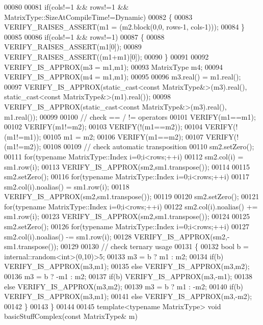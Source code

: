 \begin{DoxyCode}
00080 
00081   \textcolor{keywordflow}{if}(cols!=1 && rows!=1 && MatrixType::SizeAtCompileTime!=Dynamic)
00082   \{
00083     VERIFY\_RAISES\_ASSERT(m1 = (m2.block(0,0, rows-1, cols-1)));
00084   \}
00085 
00086   \textcolor{keywordflow}{if}(cols!=1 && rows!=1)
00087   \{
00088     VERIFY\_RAISES\_ASSERT(m1[0]);
00089     VERIFY\_RAISES\_ASSERT((m1+m1)[0]);
00090   \}
00091 
00092   VERIFY\_IS\_APPROX(m3 = m1,m1);
00093   MatrixType m4;
00094   VERIFY\_IS\_APPROX(m4 = m1,m1);
00095 
00096   m3.real() = m1.real();
00097   VERIFY\_IS\_APPROX(static\_cast<const MatrixType&>(m3).real(), static\_cast<const MatrixType&>(m1).real());
00098   VERIFY\_IS\_APPROX(static\_cast<const MatrixType&>(m3).real(), m1.real());
00099 
00100   \textcolor{comment}{// check == / != operators}
00101   VERIFY(m1==m1);
00102   VERIFY(m1!=m2);
00103   VERIFY(!(m1==m2));
00104   VERIFY(!(m1!=m1));
00105   m1 = m2;
00106   VERIFY(m1==m2);
00107   VERIFY(!(m1!=m2));
00108   
00109   \textcolor{comment}{// check automatic transposition}
00110   sm2.setZero();
00111   \textcolor{keywordflow}{for}(\textcolor{keyword}{typename} MatrixType::Index i=0;i<rows;++i)
00112     sm2.col(i) = sm1.row(i);
00113   VERIFY\_IS\_APPROX(sm2,sm1.transpose());
00114   
00115   sm2.setZero();
00116   \textcolor{keywordflow}{for}(\textcolor{keyword}{typename} MatrixType::Index i=0;i<rows;++i)
00117     sm2.col(i).noalias() = sm1.row(i);
00118   VERIFY\_IS\_APPROX(sm2,sm1.transpose());
00119   
00120   sm2.setZero();
00121   \textcolor{keywordflow}{for}(\textcolor{keyword}{typename} MatrixType::Index i=0;i<rows;++i)
00122     sm2.col(i).noalias() += sm1.row(i);
00123   VERIFY\_IS\_APPROX(sm2,sm1.transpose());
00124   
00125   sm2.setZero();
00126   \textcolor{keywordflow}{for}(\textcolor{keyword}{typename} MatrixType::Index i=0;i<rows;++i)
00127     sm2.col(i).noalias() -= sm1.row(i);
00128   VERIFY\_IS\_APPROX(sm2,-sm1.transpose());
00129   
00130   \textcolor{comment}{// check ternary usage}
00131   \{
00132     \textcolor{keywordtype}{bool} b = internal::random<int>(0,10)>5;
00133     m3 = b ? m1 : m2;
00134     \textcolor{keywordflow}{if}(b) VERIFY\_IS\_APPROX(m3,m1);
00135     \textcolor{keywordflow}{else}  VERIFY\_IS\_APPROX(m3,m2);
00136     m3 = b ? -m1 : m2;
00137     \textcolor{keywordflow}{if}(b) VERIFY\_IS\_APPROX(m3,-m1);
00138     \textcolor{keywordflow}{else}  VERIFY\_IS\_APPROX(m3,m2);
00139     m3 = b ? m1 : -m2;
00140     \textcolor{keywordflow}{if}(b) VERIFY\_IS\_APPROX(m3,m1);
00141     \textcolor{keywordflow}{else}  VERIFY\_IS\_APPROX(m3,-m2);
00142   \}
00143 \}
00144 
00145 \textcolor{keyword}{template}<\textcolor{keyword}{typename} MatrixType> \textcolor{keywordtype}{void} basicStuffComplex(\textcolor{keyword}{const} MatrixType& m)

\end{DoxyCode}
